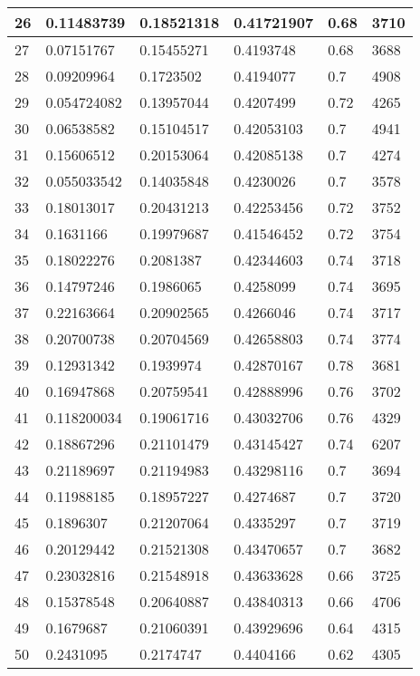 \begin{longtable}{|l|l|l|l|l|l|}
26 & 0.11483739 & 0.18521318 & 0.41721907 & 0.68 & 3710 \\ \hline 
27 & 0.07151767 & 0.15455271 & 0.4193748 & 0.68 & 3688 \\ \hline 
28 & 0.09209964 & 0.1723502 & 0.4194077 & 0.7 & 4908 \\ \hline 
29 & 0.054724082 & 0.13957044 & 0.4207499 & 0.72 & 4265 \\ \hline 
30 & 0.06538582 & 0.15104517 & 0.42053103 & 0.7 & 4941 \\ \hline 
31 & 0.15606512 & 0.20153064 & 0.42085138 & 0.7 & 4274 \\ \hline 
32 & 0.055033542 & 0.14035848 & 0.4230026 & 0.7 & 3578 \\ \hline 
33 & 0.18013017 & 0.20431213 & 0.42253456 & 0.72 & 3752 \\ \hline 
34 & 0.1631166 & 0.19979687 & 0.41546452 & 0.72 & 3754 \\ \hline 
35 & 0.18022276 & 0.2081387 & 0.42344603 & 0.74 & 3718 \\ \hline 
36 & 0.14797246 & 0.1986065 & 0.4258099 & 0.74 & 3695 \\ \hline 
37 & 0.22163664 & 0.20902565 & 0.4266046 & 0.74 & 3717 \\ \hline 
38 & 0.20700738 & 0.20704569 & 0.42658803 & 0.74 & 3774 \\ \hline 
39 & 0.12931342 & 0.1939974 & 0.42870167 & 0.78 & 3681 \\ \hline 
40 & 0.16947868 & 0.20759541 & 0.42888996 & 0.76 & 3702 \\ \hline 
41 & 0.118200034 & 0.19061716 & 0.43032706 & 0.76 & 4329 \\ \hline 
42 & 0.18867296 & 0.21101479 & 0.43145427 & 0.74 & 6207 \\ \hline 
43 & 0.21189697 & 0.21194983 & 0.43298116 & 0.7 & 3694 \\ \hline 
44 & 0.11988185 & 0.18957227 & 0.4274687 & 0.7 & 3720 \\ \hline 
45 & 0.1896307 & 0.21207064 & 0.4335297 & 0.7 & 3719 \\ \hline 
46 & 0.20129442 & 0.21521308 & 0.43470657 & 0.7 & 3682 \\ \hline 
47 & 0.23032816 & 0.21548918 & 0.43633628 & 0.66 & 3725 \\ \hline 
48 & 0.15378548 & 0.20640887 & 0.43840313 & 0.66 & 4706 \\ \hline 
49 & 0.1679687 & 0.21060391 & 0.43929696 & 0.64 & 4315 \\ \hline 
50 & 0.2431095 & 0.2174747 & 0.4404166 & 0.62 & 4305 \\ \hline 
\end{longtable}